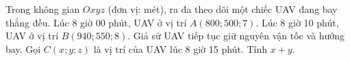 \begin{ex}
Trong không gian $Oxyz$ (đơn vị: mét), ra đa theo dõi một chiếc UAV đang bay thẳng đều. Lúc 8 giờ 00 phút, UAV ở vị trí $A(800;500;7)$. Lúc 8 giờ 10 phút, UAV ở vị trí $B(940;550;8)$. Giả sử UAV tiếp tục giữ nguyên vận tốc và hướng bay. Gọi $C(x;y;z)$ là vị trí của UAV lúc 8 giờ 15 phút. Tính $x+y$.
\end{ex}
